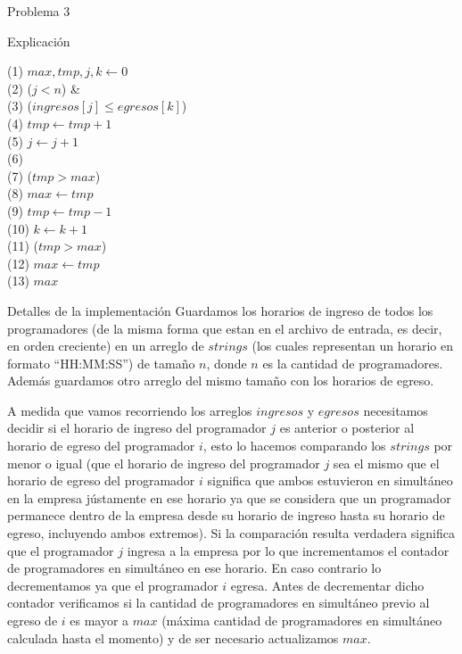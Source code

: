 \begin{section}{Problema 3}
\begin{subsection}{Explicación}
		\vspace{0.5cm}
		\begin{pseudo}
(1)				\tab $max,tmp,j,k \leftarrow 0$ \\
(2)				\tab \WHILE($j< n$) &   \\
(3)				\tab \tab \IF($ingresos[j]\leq egresos[k]$) \\
(4)				\tab \tab \tab $tmp \leftarrow tmp+1$ \\
(5)				\tab \tab \tab $j \leftarrow j+1$ \\
(6)				\tab \tab \ELSE \\
(7)				\tab \tab \tab \IF($tmp>max$) \\
(8)				\tab \tab \tab \tab $max \leftarrow tmp$ \\
(9)				\tab \tab \tab $tmp \leftarrow tmp - 1$ \\				(10)				\tab \tab \tab $k \leftarrow k+1$ \\
(11)				\tab \IF($tmp>max$) \\
(12)				\tab \tab $max \leftarrow tmp$ \\
(13)				\tab \RET $max$
		\end{pseudo}




	\end{subsection}

	\begin{subsection}{Detalles de la implementación}
	Guardamos los horarios de ingreso de todos los programadores (de la misma forma que estan en el archivo de entrada, es decir, en orden creciente) en un arreglo de $strings$ (los cuales representan un horario en formato ``HH:MM:SS'') de tamaño $n$, donde $n$ es la cantidad de programadores. Además guardamos otro arreglo del mismo tamaño con los horarios de egreso.
	
	A medida que vamos recorriendo los arreglos $ingresos$ y $egresos$ necesitamos decidir si el horario de ingreso del programador $j$ es anterior o posterior al horario de egreso del programador $i$, esto lo hacemos comparando los $strings$ por menor o igual (que el horario de ingreso del programador $j$ sea el mismo que el horario de egreso del programador $i$ significa que ambos estuvieron en simultáneo en la empresa jústamente en ese horario ya que se considera que un programador permanece dentro de la empresa desde su horario de ingreso hasta su horario de egreso, incluyendo ambos extremos). Si la comparación resulta verdadera significa que el programador $j$ ingresa a la empresa por lo que incrementamos el contador de programadores en simultáneo en ese horario. En caso contrario lo decrementamos ya que el programador $i$ egresa. Antes de decrementar dicho contador verificamos si la cantidad de programadores en simultáneo previo al egreso de $i$ es mayor a $max$ (máxima cantidad de programadores en simultáneo calculada hasta el momento) y de ser necesario actualizamos $max$.


\end{subsection}
\end{section}
